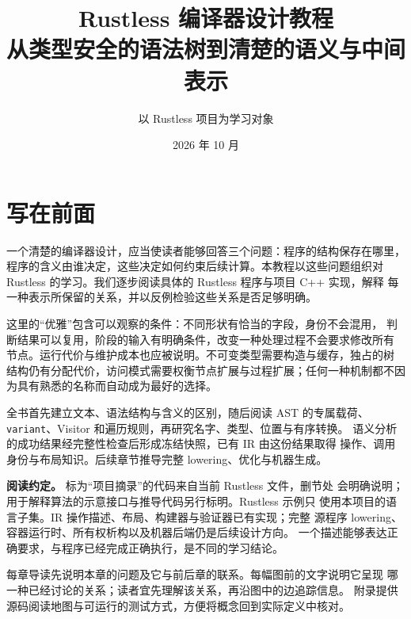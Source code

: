 \documentclass[UTF8,fontset=fandol,11pt,openany]{ctexbook}
\title{Rustless 编译器设计教程\\[8pt]
  \large 从类型安全的语法树到清楚的语义与中间表示}
\author{以 Rustless 项目为学习对象}
\date{2026 年 10 月}
\begin{document}
\raggedbottom
\frontmatter
\maketitle
\chapter*{写在前面}
一个清楚的编译器设计，应当使读者能够回答三个问题：程序的结构保存在哪里，
程序的含义由谁决定，这些决定如何约束后续计算。本教程以这些问题组织对
Rustless 的学习。我们逐步阅读具体的 Rustless 程序与项目 C++ 实现，解释
每一种表示所保留的关系，并以反例检验这些关系是否足够明确。

这里的“优雅”包含可以观察的条件：不同形状有恰当的字段，身份不会混用，
判断结果可以复用，阶段的输入有明确条件，改变一种处理过程不会要求修改所有
节点。运行代价与维护成本也应被说明。不可变类型需要构造与缓存，独占的树
结构仍有分配代价，访问模式需要权衡节点扩展与过程扩展；任何一种机制都不因
为具有熟悉的名称而自动成为最好的选择。

全书首先建立文本、语法结构与含义的区别，随后阅读 AST 的专属载荷、
\texttt{variant}、Visitor 和遍历规则，再研究名字、类型、位置与有序转换。
语义分析的成功结果经完整性检查后形成冻结快照，已有 IR 由这份结果取得
操作、调用身份与布局知识。后续章节推导完整 lowering、优化与机器生成。

\textbf{阅读约定。} 标为“项目摘录”的代码来自当前 Rustless 文件，删节处
会明确说明；用于解释算法的示意接口与推导代码另行标明。Rustless 示例只
使用本项目的语言子集。IR 操作描述、布局、构建器与验证器已有实现；完整
源程序 lowering、容器运行时、所有权析构以及机器后端仍是后续设计方向。
一个描述能够表达正确要求，与程序已经完成正确执行，是不同的学习结论。

每章导读先说明本章的问题及它与前后章的联系。每幅图前的文字说明它呈现
哪一种已经讨论的关系；读者宜先理解该关系，再沿图中的边追踪信息。
附录提供源码阅读地图与可运行的测试方式，方便将概念回到实际定义中核对。
\tableofcontents
\mainmatter
\end{document}

